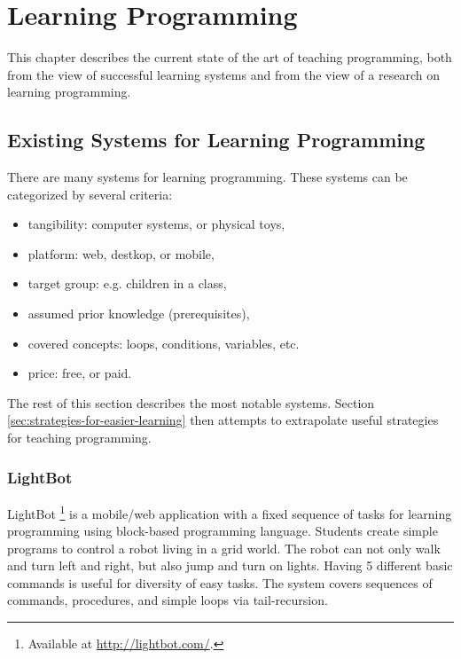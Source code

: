 \chapter{Learning Programming}
\label{chap:learning-programming}

This chapter describes the current state of the art of teaching programming, both from the view of successful learning systems and from the view of a research on learning programming.

\section{Existing Systems for Learning Programming}
\label{sec:existing-systems}

There are many systems for learning programming.
These systems can be categorized by several criteria:

\begin{itemize}
\item tangibility: computer systems, or physical toys,
\item platform: web, destkop, or mobile,
\item target group: e.g. children in a class,
\item assumed prior knowledge (prerequisites),
\item covered concepts: loops, conditions, variables, etc.
\item price: free, or paid.
\end{itemize}

The rest of this section describes the most notable systems.
Section \ref{sec:strategies-for-easier-learning} then attempts to extrapolate useful strategies for teaching programming.


\subsection{LightBot}
\label{sec:lightbot}
LightBot%
\footnote{Available at \url{http://lightbot.com/}.}
is a mobile/web application with a fixed sequence of tasks for learning programming
using block-based programming language.
Students create simple programs to control a robot living in a grid world.
The robot can not only walk and turn left and right, but also jump and turn on lights.
Having 5 different basic commands is useful for diversity of easy tasks.
The system covers sequences of commands, procedures, and simple loops via tail-recursion.


